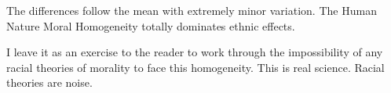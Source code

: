 \documentclass{amsart}
\begin{document}
The differences follow the mean with extremely minor variation.  The Human Nature Moral Homogeneity totally dominates ethnic effects.

I leave it as an exercise to the reader to work through the impossibility of any racial theories of morality to face this homogeneity.  This is real science.  Racial theories are noise.
\end{document}
